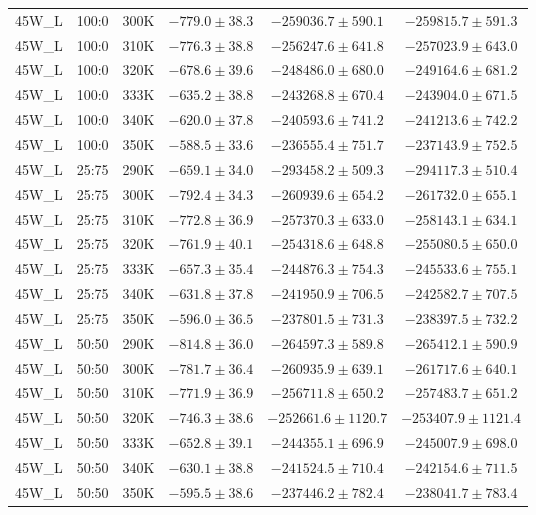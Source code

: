\begin{longtable}{|c|c|c|c|c|c|}
45W\_L & 100:0 & 300K & $-779.0 \pm 38.3$ & $-259036.7 \pm 590.1$ & $-259815.7 \pm 591.3$ \\
45W\_L & 100:0 & 310K & $-776.3 \pm 38.8$ & $-256247.6 \pm 641.8$ & $-257023.9 \pm 643.0$ \\
45W\_L & 100:0 & 320K & $-678.6 \pm 39.6$ & $-248486.0 \pm 680.0$ & $-249164.6 \pm 681.2$ \\
45W\_L & 100:0 & 333K & $-635.2 \pm 38.8$ & $-243268.8 \pm 670.4$ & $-243904.0 \pm 671.5$ \\
45W\_L & 100:0 & 340K & $-620.0 \pm 37.8$ & $-240593.6 \pm 741.2$ & $-241213.6 \pm 742.2$ \\
45W\_L & 100:0 & 350K & $-588.5 \pm 33.6$ & $-236555.4 \pm 751.7$ & $-237143.9 \pm 752.5$ \\
45W\_L & 25:75 & 290K & $-659.1 \pm 34.0$ & $-293458.2 \pm 509.3$ & $-294117.3 \pm 510.4$ \\
45W\_L & 25:75 & 300K & $-792.4 \pm 34.3$ & $-260939.6 \pm 654.2$ & $-261732.0 \pm 655.1$ \\
45W\_L & 25:75 & 310K & $-772.8 \pm 36.9$ & $-257370.3 \pm 633.0$ & $-258143.1 \pm 634.1$ \\
45W\_L & 25:75 & 320K & $-761.9 \pm 40.1$ & $-254318.6 \pm 648.8$ & $-255080.5 \pm 650.0$ \\
45W\_L & 25:75 & 333K & $-657.3 \pm 35.4$ & $-244876.3 \pm 754.3$ & $-245533.6 \pm 755.1$ \\
45W\_L & 25:75 & 340K & $-631.8 \pm 37.8$ & $-241950.9 \pm 706.5$ & $-242582.7 \pm 707.5$ \\
45W\_L & 25:75 & 350K & $-596.0 \pm 36.5$ & $-237801.5 \pm 731.3$ & $-238397.5 \pm 732.2$ \\
45W\_L & 50:50 & 290K & $-814.8 \pm 36.0$ & $-264597.3 \pm 589.8$ & $-265412.1 \pm 590.9$ \\
45W\_L & 50:50 & 300K & $-781.7 \pm 36.4$ & $-260935.9 \pm 639.1$ & $-261717.6 \pm 640.1$ \\
45W\_L & 50:50 & 310K & $-771.9 \pm 36.9$ & $-256711.8 \pm 650.2$ & $-257483.7 \pm 651.2$ \\
45W\_L & 50:50 & 320K & $-746.3 \pm 38.6$ & $-252661.6 \pm 1120.7$ & $-253407.9 \pm 1121.4$ \\
45W\_L & 50:50 & 333K & $-652.8 \pm 39.1$ & $-244355.1 \pm 696.9$ & $-245007.9 \pm 698.0$ \\
45W\_L & 50:50 & 340K & $-630.1 \pm 38.8$ & $-241524.5 \pm 710.4$ & $-242154.6 \pm 711.5$ \\
45W\_L & 50:50 & 350K & $-595.5 \pm 38.6$ & $-237446.2 \pm 782.4$ & $-238041.7 \pm 783.4$ \\

\end{longtable}
